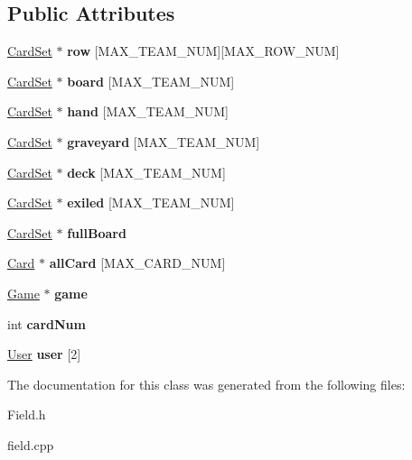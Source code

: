 \subsection*{Public Attributes}
\begin{DoxyCompactItemize}
\item 
\mbox{\label{class_field_a040ac6707c8997f46aacff6d959774f3}} 
\hyperlink{class_card_set}{Card\+Set} $\ast$ {\bfseries row} \mbox{[}M\+A\+X\+\_\+\+T\+E\+A\+M\+\_\+\+N\+UM\mbox{]}\mbox{[}M\+A\+X\+\_\+\+R\+O\+W\+\_\+\+N\+UM\mbox{]}
\item 
\mbox{\label{class_field_a2cab1602d03ca6ce1e58933e52a42794}} 
\hyperlink{class_card_set}{Card\+Set} $\ast$ {\bfseries board} \mbox{[}M\+A\+X\+\_\+\+T\+E\+A\+M\+\_\+\+N\+UM\mbox{]}
\item 
\mbox{\label{class_field_a9963affea21ffa65dbf2006670f8b719}} 
\hyperlink{class_card_set}{Card\+Set} $\ast$ {\bfseries hand} \mbox{[}M\+A\+X\+\_\+\+T\+E\+A\+M\+\_\+\+N\+UM\mbox{]}
\item 
\mbox{\label{class_field_a346b27b71eae29de9da765e12e901e09}} 
\hyperlink{class_card_set}{Card\+Set} $\ast$ {\bfseries graveyard} \mbox{[}M\+A\+X\+\_\+\+T\+E\+A\+M\+\_\+\+N\+UM\mbox{]}
\item 
\mbox{\label{class_field_a2f9231d18fb7f2d79293d84cd1c25f5a}} 
\hyperlink{class_card_set}{Card\+Set} $\ast$ {\bfseries deck} \mbox{[}M\+A\+X\+\_\+\+T\+E\+A\+M\+\_\+\+N\+UM\mbox{]}
\item 
\mbox{\label{class_field_ae78e4061ddbb02987b8bd17b8932938f}} 
\hyperlink{class_card_set}{Card\+Set} $\ast$ {\bfseries exiled} \mbox{[}M\+A\+X\+\_\+\+T\+E\+A\+M\+\_\+\+N\+UM\mbox{]}
\item 
\mbox{\label{class_field_a0be9226544c2d32e869d9f107c3c8fdb}} 
\hyperlink{class_card_set}{Card\+Set} $\ast$ {\bfseries full\+Board}
\item 
\mbox{\label{class_field_aa982bf39d02fde302c53e3b0fdd7b25a}} 
\hyperlink{class_card}{Card} $\ast$ {\bfseries all\+Card} \mbox{[}M\+A\+X\+\_\+\+C\+A\+R\+D\+\_\+\+N\+UM\mbox{]}
\item 
\mbox{\label{class_field_a6c884f5f7251cff1ded52697260ecc59}} 
\hyperlink{class_game}{Game} $\ast$ {\bfseries game}
\item 
\mbox{\label{class_field_ae84e6dbea75306aa3485a5af41481a02}} 
int {\bfseries card\+Num}
\item 
\mbox{\label{class_field_a614cbb3b1d345e61155a154345671c30}} 
\hyperlink{class_user}{User} {\bfseries user} \mbox{[}2\mbox{]}
\end{DoxyCompactItemize}


The documentation for this class was generated from the following files\+:\begin{DoxyCompactItemize}
\item 
Field.\+h\item 
field.\+cpp\end{DoxyCompactItemize}
